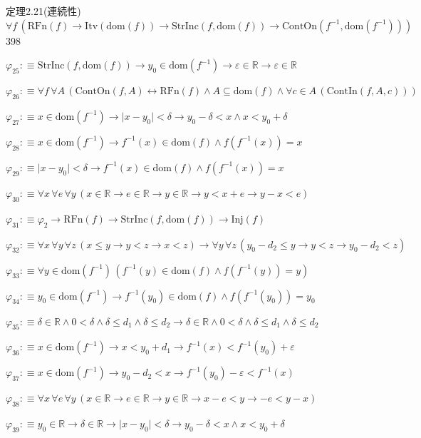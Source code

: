 \begin{fullproof}{定理2.21(連続性)}{$\forall f\,(\mathrm{RFn}(f) \to \mathrm{Itv}(\mathrm{dom}(f)) \to \mathrm{StrInc}(f,\mathrm{dom}(f)) \to \mathrm{ContOn}(f^{-1},\mathrm{dom}(f^{-1})))$}{398}
\begin{abbrevlist}
\item $\varphi_{25} :\equiv \mathrm{StrInc}(f,\mathrm{dom}(f)) \to y_{0} \in \mathrm{dom}(f^{-1}) \to \varepsilon \in \mathbb{R} \to \varepsilon \in \mathbb{R}$
\item $\varphi_{26} :\equiv \forall f\,\forall A\,(\mathrm{ContOn}(f,A) \leftrightarrow \mathrm{RFn}(f) \land A \subseteq \mathrm{dom}(f) \land \forall c \in A\,(\mathrm{ContIn}(f,A,c)))$
\item $\varphi_{27} :\equiv x \in \mathrm{dom}(f^{-1}) \to \lvert x - y_{0} \rvert < \delta \to y_{0} - \delta < x \land x < y_{0} + \delta$
\item $\varphi_{28} :\equiv x \in \mathrm{dom}(f^{-1}) \to f^{-1}(x) \in \mathrm{dom}(f) \land f(f^{-1}(x)) = x$
\item $\varphi_{29} :\equiv \lvert x - y_{0} \rvert < \delta \to f^{-1}(x) \in \mathrm{dom}(f) \land f(f^{-1}(x)) = x$
\item $\varphi_{30} :\equiv \forall x\,\forall e\,\forall y\,(x \in \mathbb{R} \to e \in \mathbb{R} \to y \in \mathbb{R} \to y < x + e \to y - x < e)$
\item $\varphi_{31} :\equiv \varphi_{2} \to \mathrm{RFn}(f) \to \mathrm{StrInc}(f,\mathrm{dom}(f)) \to \mathrm{Inj}(f)$
\item $\varphi_{32} :\equiv \forall x\,\forall y\,\forall z\,(x \leq y \to y < z \to x < z) \to \forall y\,\forall z\,(y_{0} - d_{2} \leq y \to y < z \to y_{0} - d_{2} < z)$
\item $\varphi_{33} :\equiv \forall y \in \mathrm{dom}(f^{-1})\,(f^{-1}(y) \in \mathrm{dom}(f) \land f(f^{-1}(y)) = y)$
\item $\varphi_{34} :\equiv y_{0} \in \mathrm{dom}(f^{-1}) \to f^{-1}(y_{0}) \in \mathrm{dom}(f) \land f(f^{-1}(y_{0})) = y_{0}$
\item $\varphi_{35} :\equiv \delta \in \mathbb{R} \land 0 < \delta \land \delta \leq d_{1} \land \delta \leq d_{2} \to \delta \in \mathbb{R} \land 0 < \delta \land \delta \leq d_{1} \land \delta \leq d_{2}$
\item $\varphi_{36} :\equiv x \in \mathrm{dom}(f^{-1}) \to x < y_{0} + d_{1} \to f^{-1}(x) < f^{-1}(y_{0}) + \varepsilon$
\item $\varphi_{37} :\equiv x \in \mathrm{dom}(f^{-1}) \to y_{0} - d_{2} < x \to f^{-1}(y_{0}) - \varepsilon < f^{-1}(x)$
\item $\varphi_{38} :\equiv \forall x\,\forall e\,\forall y\,(x \in \mathbb{R} \to e \in \mathbb{R} \to y \in \mathbb{R} \to x - e < y \to -e < y - x)$
\item $\varphi_{39} :\equiv y_{0} \in \mathbb{R} \to \delta \in \mathbb{R} \to \lvert x - y_{0} \rvert < \delta \to y_{0} - \delta < x \land x < y_{0} + \delta$

\end{abbrevlist}
\end{fullproof}
